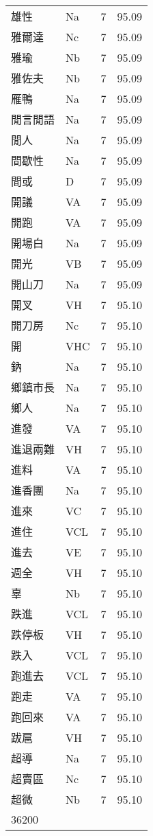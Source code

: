 \documentclass[twocolumn]{book}
\begin{document}
\begin{supertabular}{llrr}
雄性 & Na & 7 &  95.09\\
雅爾達 & Nc & 7 &  95.09\\
雅瑜 & Nb & 7 &  95.09\\
雅佐夫 & Nb & 7 &  95.09\\
雁鴨 & Na & 7 &  95.09\\
閒言閒語 & Na & 7 &  95.09\\
閒人 & Na & 7 &  95.09\\
間歇性 & Na & 7 &  95.09\\
間或 & D & 7 &  95.09\\
開議 & VA & 7 &  95.09\\
開跑 & VA & 7 &  95.09\\
開場白 & Na & 7 &  95.09\\
開光 & VB & 7 &  95.09\\
開山刀 & Na & 7 &  95.09\\
開叉 & VH & 7 &  95.10\\
開刀房 & Nc & 7 &  95.10\\
開 & VHC & 7 &  95.10\\
鈉 & Na & 7 &  95.10\\
鄉鎮市長 & Na & 7 &  95.10\\
鄉人 & Na & 7 &  95.10\\
進發 & VA & 7 &  95.10\\
進退兩難 & VH & 7 &  95.10\\
進料 & VA & 7 &  95.10\\
進香團 & Na & 7 &  95.10\\
進來 & VC & 7 &  95.10\\
進住 & VCL & 7 &  95.10\\
進去 & VE & 7 &  95.10\\
週全 & VH & 7 &  95.10\\
辜 & Nb & 7 &  95.10\\
跌進 & VCL & 7 &  95.10\\
跌停板 & VH & 7 &  95.10\\
跌入 & VCL & 7 &  95.10\\
跑進去 & VCL & 7 &  95.10\\
跑走 & VA & 7 &  95.10\\
跑回來 & VA & 7 &  95.10\\
跋扈 & VH & 7 &  95.10\\
超導 & Na & 7 &  95.10\\
超賣區 & Nc & 7 &  95.10\\
超微 & Nb & 7 &  95.10\\
36200\\

\end{supertabular}
\end{document}
